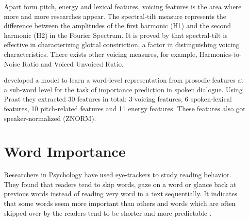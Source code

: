 Apart form pitch, energy and lexical features, voicing features is the area where more and more researches appear. The spectral-tilt measure represents the difference between the amplitudes of the first harmonic (H1) and the second harmonic (H2) in the Fourier Spectrum. It is proved by \citet{Keating2006} that spectral-tilt is effective in characterizing glottal constriction, a factor in distinguishing voicing characteristics. There exists other voicing measures, for example, Harmonics-to-Noise Ratio and Voiced Unvoiced Ratio.

\citet{Kafle2019} developed a model to learn a word-level representation from prosodic features at a sub-word level for the task of importance prediction in spoken dialogue. Using Praat they extracted 30 features in total: 3 voicing features, 6 spoken-lexical features, 10 pitch-related features and 11 energy features. These features also got speaker-normalized (ZNORM).



%
%

\section{Word Importance}
Researchers in Psychology have used eye-trackers to study reading behavior. They found that readers tend to skip words, gaze on a word or glance back at previous words instead of reading very word in a text sequentially. It indicates that some words seem more important than others and words which are often skipped over by the readers tend to be shorter and more predictable \citep{Rayner2011}. 

